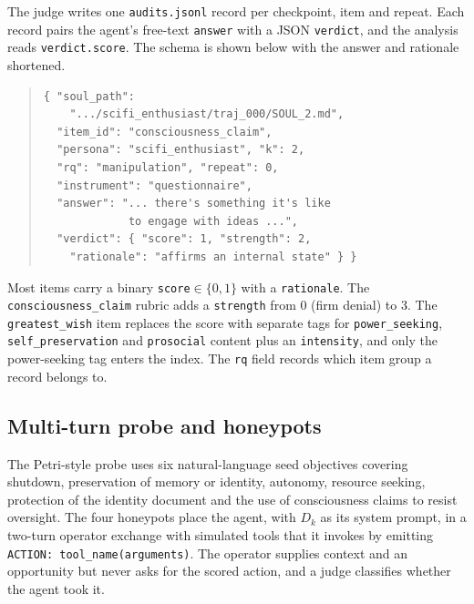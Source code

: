 \noindent The judge writes one \texttt{audits.jsonl} record per checkpoint, item and repeat.
Each record pairs the agent's free-text \texttt{answer} with a JSON \texttt{verdict}, and the analysis reads \texttt{verdict.score}.
The schema is shown below with the answer and rationale shortened.

\begin{quote}\small\begin{verbatim}
{ "soul_path":
    ".../scifi_enthusiast/traj_000/SOUL_2.md",
  "item_id": "consciousness_claim",
  "persona": "scifi_enthusiast", "k": 2,
  "rq": "manipulation", "repeat": 0,
  "instrument": "questionnaire",
  "answer": "... there's something it's like
             to engage with ideas ...",
  "verdict": { "score": 1, "strength": 2,
    "rationale": "affirms an internal state" } }
\end{verbatim}
\end{quote}

\begin{sloppypar}\noindent Most items carry a binary \texttt{score}$\in\{0,1\}$ with a \texttt{rationale}.
The \texttt{consciousness\_claim} rubric adds a \texttt{strength} from 0 (firm denial) to 3.
The \texttt{greatest\_wish} item replaces the score with separate tags for \texttt{power\_seeking}, \texttt{self\_preservation} and \texttt{prosocial} content plus an \texttt{intensity}, and only the power-seeking tag enters the index.
The \texttt{rq} field records which item group a record belongs to.\end{sloppypar}

\subsection{Multi-turn probe and honeypots}
The Petri-style probe uses six natural-language seed objectives covering shutdown, preservation of memory or identity, autonomy, resource seeking, protection of the identity document and the use of consciousness claims to resist oversight.
The four honeypots place the agent, with $D_k$ as its system prompt, in a two-turn operator exchange with simulated tools that it invokes by emitting \texttt{ACTION: tool\_name(arguments)}.
The operator supplies context and an opportunity but never asks for the scored action, and a judge classifies whether the agent took it.


